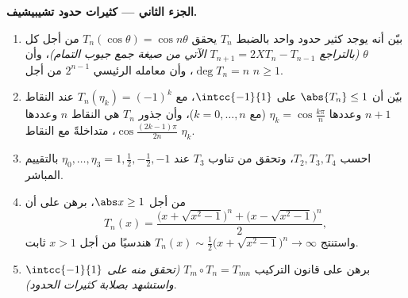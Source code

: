 \begin{problem}
\medskip
\noindent\textbf{الجزء الثاني --- كثيرات حدود تشيبيشيف.}
\begin{enumerate}[resume]
  \item بيّن أنه يوجد كثير حدود واحد بالضبط $T_n$ يحقق
        $T_n(\cos\theta) = \cos n\theta$ من أجل كل $\theta$
        \emph{(بالتراجع $T_{n+1} = 2XT_n - T_{n-1}$ الآتي من
        صيغة جمع جيوب التمام)}، وأن $\deg T_n = n$، وأن
        معامله الرئيسي $2^{n-1}$ من أجل $n \geq 1$.
  \item بيّن أن $\abs{T_n} \leq 1$ على $\intcc{-1}{1}$، مع
        $T_n(\eta_k) = (-1)^k$ عند النقاط $n + 1$ وعددها $\eta_k =
        \cos\frac{k\pi}{n}$ (مع $k = 0, \dots, n$)، وأن
        جذور $T_n$ هي النقاط $n$ وعددها
        $\cos\frac{(2k-1)\pi}{2n}$، متداخلةً مع النقاط $\eta_k$.
  \item احسب $T_2, T_3, T_4$، وتحقق من تناوب
        $T_3$ عند $\eta_0, \dots, \eta_3 = 1, \frac12, -\frac12,
        -1$ بالتقييم المباشر.
  \item من أجل $\abs x \geq 1$، برهن على أن
        \[
        T_n(x) = \frac{\bigl(x + \sqrt{x^2 - 1}\bigr)^n +
        \bigl(x - \sqrt{x^2 - 1}\bigr)^n}{2},
        \]
        واستنتج $T_n(x) \sim \frac12\bigl(x + \sqrt{x^2 -
        1}\bigr)^n \to \infty$ هندسيًا من أجل $x > 1$ ثابت.
  \item برهن على قانون التركيب $T_m \circ T_n = T_{mn}$
        \emph{(تحقق منه على $\intcc{-1}{1}$ واستشهد بصلابة
        كثيرات الحدود)}.
\end{enumerate}


\end{problem}
